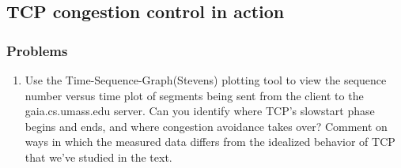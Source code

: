 \subsection{TCP congestion control in action}
    \subsubsection*{Problems}
    \begin{enumerate}[label=\bfseries Problem \arabic*:,leftmargin=*,labelindent=1em]
    \addtocounter{enumi}{11}
        \item Use the Time-Sequence-Graph(Stevens) plotting tool to view the sequence number versus time plot of segments being sent from the client to the gaia.cs.umass.edu server. Can you identify where TCP’s slowstart phase begins and ends, and where congestion avoidance takes over? Comment on ways in which the measured data differs from the idealized behavior of TCP that we’ve studied in the text.\\[0.2mm]
        \soln
    \end{enumerate}
\newpage